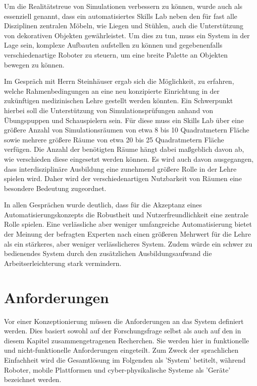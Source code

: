 Um die Realitätstreue von Simulationen verbessern zu können, wurde auch als essenziell genannt, dass ein automatisiertes Skills Lab neben den für fast alle Disziplinen zentralen Möbeln, wie Liegen und Stühlen, auch die Unterstützung von dekorativen Objekten gewährleistet. Um dies zu tun, muss ein System in der Lage sein, komplexe Aufbauten aufstellen zu können und gegebenenfalls verschiedenartige Roboter zu steuern, um eine breite Palette an Objekten bewegen zu können.

Im Gespräch mit Herrn Steinhäuser ergab sich die Möglichkeit, zu erfahren, welche Rahmenbedingungen an eine neu konzipierte Einrichtung in der zukünftigen medizinischen Lehre gestellt werden könnten. Ein Schwerpunkt hierbei soll die Unterstützung von Simulationsprüfungen anhand von Übungspuppen und Schauspielern sein. Für diese muss ein Skills Lab über eine größere Anzahl von Simulationsräumen von etwa 8 bis 10 Quadratmetern Fläche sowie mehrere größere Räume von etwa 20 bis 25 Quadratmetern Fläche verfügen. Die Anzahl der benötigten Räume hängt dabei maßgeblich davon ab, wie verschieden diese eingesetzt werden können. Es wird auch davon ausgegangen, dass interdisziplinäre Ausbildung eine zunehmend größere Rolle in der Lehre spielen wird. Daher wird der verschiedenartigen Nutzbarkeit von Räumen eine besondere Bedeutung zugeordnet.

In allen Gesprächen wurde deutlich, dass für die Akzeptanz eines Automatisierungskonzepts die Robustheit und Nutzerfreundlichkeit eine zentrale Rolle spielen. Eine verlässliche aber weniger umfangreiche Automatisierung bietet der Meinung der befragten Experten nach einen größeren Mehrwert für die Lehre als ein stärkeres, aber weniger verlässlicheres System. Zudem würde ein schwer zu bedienendes System durch den zusätzlichen Ausbildungsaufwand die Arbeitserleichterung stark vermindern.


\section{Anforderungen}

Vor einer Konzeptionierung müssen die Anforderungen an das System definiert werden. Dies basiert sowohl auf der Forschungsfrage selbst als auch auf den in diesem Kapitel zusammengetragenen Recherchen. Sie werden hier in funktionelle und nicht-funktionelle Anforderungen eingeteilt. Zum Zweck der sprachlichen Einfachheit wird die Gesamtlösung im Folgenden als 'System' betitelt, während Roboter, mobile Plattformen und cyber-physikalische Systeme als 'Geräte' bezeichnet werden.

